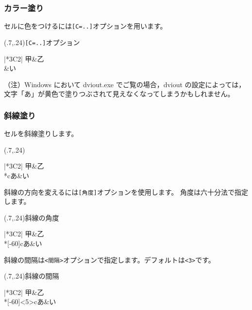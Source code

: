 \subsubsection{カラー塗り}
セルに色をつけるには\texttt{[C=..]}オプションを用います。

\begin{showEx}(.7,.24){\texttt{[C=..]}オプション}
\begin{Hyou}{|*3{C{2\zw}|}}\hline
  甲&乙\\\hline
  &い\\\hline
\end{Hyou}
\end{showEx}

（注）Windows において dviout.exe でご覧の場合，dviout の設定によっては，
文字「あ」が黄色で塗りつぶされて見えなくなってしまうかもしれません。

\subsubsection{斜線塗り}
セルを斜線塗りします。

\begin{showEx}(.7,.24){}
\begin{Hyou}{|*3{C{2\zw}|}}\hline
  甲&乙\\\hline
  \EMcell**{c}{あ}&い\\\hline
\end{Hyou}
\end{showEx}

斜線の方向を変えるには\verb+[角度]+オプションを使用します。
角度は六十分法で指定します。

\begin{showEx}(.7,.24){斜線の角度}
\begin{Hyou}{|*3{C{2\zw}|}}\hline
  甲&乙\\\hline
  \EMcell**[-60]{c}{あ}&い\\\hline
\end{Hyou}
\end{showEx}

斜線の間隔は\verb+<間隔>+オプションで指定します。デフォルトは\verb+<3>+です。

\begin{showEx}(.7,.24){斜線の間隔}
\begin{Hyou}{|*3{C{2\zw}|}}\hline
  甲&乙\\\hline
  \EMcell**[-60]<5>{c}{あ}&い\\\hline
\end{Hyou}
\end{showEx}

